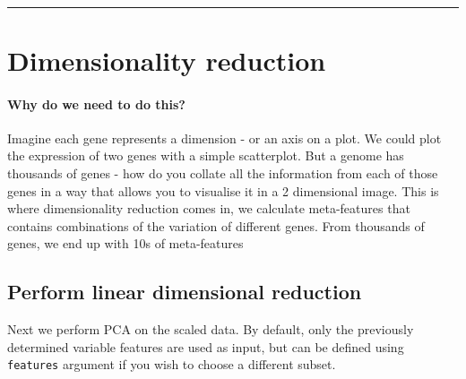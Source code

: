 \documentclass[
]{book}
\begin{document}
~

\begin{center}\rule{0.5\linewidth}{0.5pt}\end{center}

\chapter{Dimensionality reduction}\label{dimensionality-reduction}

\subsubsection*{Why do we need to do this?}\label{why-do-we-need-to-do-this-4}

Imagine each gene represents a dimension - or an axis on a plot. We could plot the expression of two genes with a simple scatterplot. But a genome has thousands of genes - how do you collate all the information from each of those genes in a way that allows you to visualise it in a 2 dimensional image. This is where dimensionality reduction comes in, we calculate meta-features that contains combinations of the variation of different genes. From thousands of genes, we end up with 10s of meta-features

\subsubsection*{}\label{section-7}

\section{Perform linear dimensional reduction}\label{perform-linear-dimensional-reduction}

Next we perform PCA on the scaled data. By default, only the previously determined variable features are used as input, but can be defined using \texttt{features} argument if you wish to choose a different subset.
\end{document}

